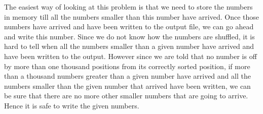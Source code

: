 \begin{comment}
Of these two approaches, which one performs better on the same input? 
We can add timing decorators to the function like so:

\begin{verbatim} 
import time
def print_timing(func):
    def wrapper(*arg):
        t1 = time.time()
        res = func(*arg)
        t2 = time.time()
        editor.AddText("\n" + func.func_name 
		+ " took " + str((t2-t1)*1000.0) + " ms\n")
        return res
    return wrapper
\end{verbatim} 

We then add a decorator to each function:

\begin{verbatim} 
@print_timing
def TryHeap(k, n, a, b):
    ...
\end{verbatim} 

The timings thus obtained tell us about the function's performance in 
different situations. As we might expect, with a small $k$, 
the merge version beats the heap version: 

\begin{verbatim} 
>> TryMerge(2, 1000000, 1, 10000)
TryMerge took 12014.9998665 ms

>> TryHeap(2, 1000000, 1, 10000)
TryHeap took 13969.0001011 ms
However, with a larger k, the heap version is faster (about five times as fast in one implementation):

>> TryMerge(100, 3000, 1, 10000)
TryMerge took 10780.9998989 ms

>> TryHeap(100, 3000, 1, 10000)
TryHeap took 2062.99996376 ms
\end{verbatim}

Doubling $k$ roughly quadruples the time (which is consistent with 
the assertion that the performance is $O(n^2)$ as $k$ approaches $n$). By 
comparison, doubling $k$ in the heap version is (expectedly) a linear doubling:

\begin{verbatim} 
>> TryMerge(200, 3000, 1, 10000)
TryMerge took 38062.0000362 ms

>> TryHeap(200, 3000, 1, 10000)
TryHeap took 4266.00003242 ms
\end{verbatim}

\end{comment}

The easiest way of looking at this problem is that we need to store
the numbers in memory till all the numbers smaller than this number have
arrived. Once those numbers have arrived and have been written to the
output file, we can go ahead and write this number. Since we do not
know how the numbers are shuffled, it is hard to tell when all the numbers
smaller than a given number have arrived and have been written to
the output. However since we are told that no number is off by more
than one thousand positions from its correctly sorted position, if more than
a thousand numbers greater than a given number have arrived and all the numbers
smaller than the given number that arrived have been written, we can
be sure that there are no more other smaller numbers that are going to
arrive. Hence it is safe to write the given numbers. 

